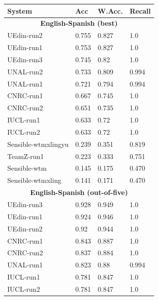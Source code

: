 \begin{table}[bt]
{\small
\begin{tabular}{|l|lll|}
\hline
System                & Acc & W.Acc. & Recall    \\ \hline
\multicolumn{4}{|c|}{\textbf{English-Spanish (best)}} \\
\hline
UEdin-run2          & 0.755    & 0.827         & 1.0                 \\
UEdin-run1          & 0.753    & 0.827         & 1.0                 \\
UEdin-run3          & 0.745    & 0.82          & 1.0                 \\
UNAL-run2           & 0.733    & 0.809         & 0.994\\
UNAL-run1           & 0.721    & 0.794         & 0.994\\
CNRC-run1           & 0.667    & 0.745         & 1.0                 \\
CNRC-run2           & 0.651    & 0.735         & 1.0                 \\
IUCL-run1           & 0.633    & 0.72          & 1.0                 \\
IUCL-run2           & 0.633    & 0.72          & 1.0                 \\
Sensible-wtmxlingyu & 0.239    & 0.351         & 0.819\\
TeamZ-run1          & 0.223    & 0.333         & 0.751\\
Sensible-wtm        & 0.145    & 0.175         & 0.470 \\
Sensible-wtmxling   & 0.141    & 0.171         & 0.470 \\
\hline
\multicolumn{4}{|c|}{\textbf{English-Spanish (out-of-five)}} \\
\hline
UEdin-run3          & 0.928    & 0.949         & 1.0                 \\
UEdin-run1          & 0.924    & 0.946         & 1.0                 \\
UEdin-run2          & 0.92     & 0.944         & 1.0                 \\
CNRC-run1           & 0.843    & 0.887         & 1.0                 \\
CNRC-run2           & 0.837    & 0.884         & 1.0                 \\
UNAL-run1           & 0.823    & 0.88          & 0.994\\
IUCL-run1           & 0.781    & 0.847         & 1.0                 \\
IUCL-run2           & 0.781    & 0.847         & 1.0                 \\

\end{tabular}}
\end{table}

